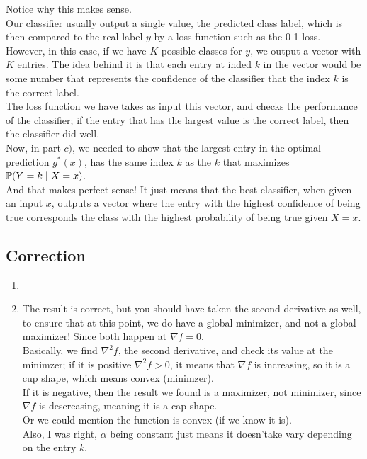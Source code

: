 \documentclass[12pt]{article}
\begin{document}
\begin{enumerate}[label=\alph*)]
    Notice why this makes sense. \\
    Our classifier usually output a single value,
    the predicted class label,
    which is then compared to the real label $y$
    by a loss function such as the 0-1 loss. \\
    However, in this case,
    if we have $K$ possible classes for $y$,
    we output a vector with $K$
    entries.
    The idea behind it is that each
    entry at inded $k$ in the vector would be
    some number that represents the confidence
    of the classifier that the index $k$
    is the correct label. \\
    The loss function we have takes as input 
    this vector, and checks the performance
    of the classifier;
    if the entry that has the largest value
    is the correct label, then the classifier
    did well. \\
    Now, in part $c)$,
    we needed to show that the largest entry
    in the optimal prediction $g^*(x)$,
    has the same index $k$
    as the $k$ that maximizes
    $\mathbb{P}(Y = k \mid X = x)$. \\
    And that makes perfect sense!
    It just means that the best classifier,
    when given an input $x$,
    outputs a vector
    where the entry with the highest
    confidence of being true corresponds
    the class with the highest probability
    of being true given $X = x$. \\
\end{enumerate}


\begingroup
\color{red}
\subsection*{Correction}
\begin{enumerate}[label=\alph*)]
    \item
    \item 
    The result is correct, but you should have
    taken the second derivative as well,
    to ensure that at this point, we do have a
    global minimizer, and not a global maximizer!
    Since both happen at $\nabla f = 0$. \\
    Basically, we find $\nabla^2 f$,
    the second derivative,
    and check its value at the minimzer;
    if it is positive $\nabla^2 f > 0$,
    it means that $\nabla f$
    is increasing, so it is a cup shape,
    which means convex (minimzer). \\
    If it is negative, then the result
    we found is a maximizer, not minimizer,
    since $\nabla f$ is descreasing,
    meaning it is a cap shape. \\
    Or we could mention the function is
    convex (if we know it is). \\
    Also, I was right,
    $\alpha$ being constant just means it doesn'take
    vary depending on the entry $k$.
\end{enumerate}
\endgroup
\end{document}
